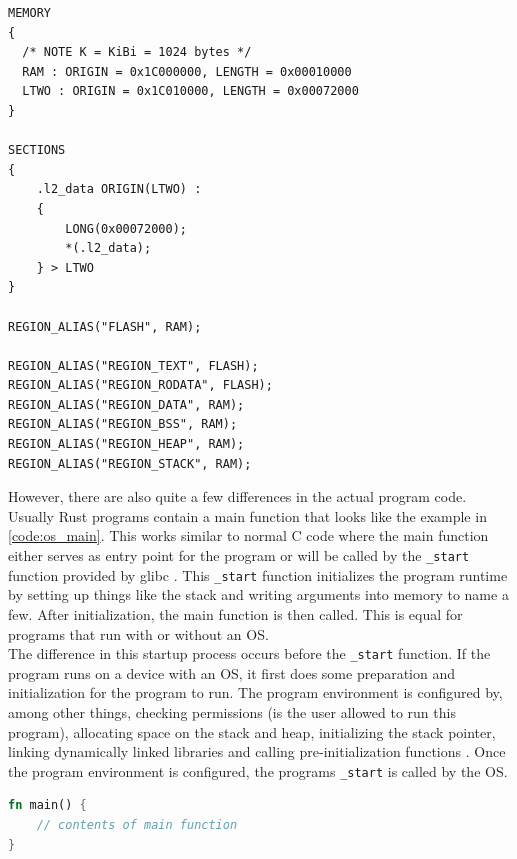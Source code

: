 \begin{lstlisting}[style=colorEX,caption={Example memory.x file},label={code:memory_x}]
MEMORY
{
  /* NOTE K = KiBi = 1024 bytes */
  RAM : ORIGIN = 0x1C000000, LENGTH = 0x00010000
  LTWO : ORIGIN = 0x1C010000, LENGTH = 0x00072000
}

SECTIONS
{
    .l2_data ORIGIN(LTWO) :
    {
        LONG(0x00072000);
        *(.l2_data);
    } > LTWO
}

REGION_ALIAS("FLASH", RAM);

REGION_ALIAS("REGION_TEXT", FLASH);
REGION_ALIAS("REGION_RODATA", FLASH);
REGION_ALIAS("REGION_DATA", RAM);
REGION_ALIAS("REGION_BSS", RAM);
REGION_ALIAS("REGION_HEAP", RAM);
REGION_ALIAS("REGION_STACK", RAM);

\end{lstlisting}


However, there are also quite a few differences in the actual program code. Usually Rust programs contain a main function that looks like the example in \ref{code:os_main}.
This works similar to normal C code where the main function either serves as entry point for the program or will be called by the \lstinline{_start} function provided by glibc \cite{before_main}.
This \lstinline{_start} function initializes the program runtime by setting up things like the stack and writing arguments into memory to name a few.
After initialization, the main function is then called.
This is equal for programs that run with or without an OS.\\
The difference in this startup process occurs before the \lstinline{_start} function.
If the program runs on a device with an OS, it first does some preparation and initialization for the program to run.
The program environment is configured by, among other things, checking permissions (is the user allowed to run this program),
allocating space on the stack and heap, initializing the stack pointer, linking dynamically linked libraries and calling pre-initialization functions \cite{before_main}.
Once the program environment is configured, the programs \lstinline{_start} is called by the OS.

\begin{lstlisting}[style=colorEX,language=Rust,caption={Standard main function in Rust},label={code:os_main}]
fn main() {
    // contents of main function
}
\end{lstlisting}

